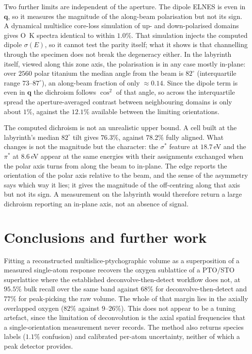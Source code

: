 \documentclass[aps,prb,twocolumn,superscriptaddress,floatfix,nofootinbib]{revtex4-2}
\begin{document}
Two further limits are independent of the aperture. The dipole ELNES is even in $\mathbf{q}$, so it measures the magnitude of the along-beam polarisation but not its sign. A dynamical multislice core-loss simulation of up- and down-polarised domains gives O~K spectra identical to within $1.0\%$. That simulation injects the computed dipole $\sigma(E)$, so it cannot test the parity itself; what it shows is that channelling through the specimen does not break the degeneracy either. In the labyrinth itself, viewed along this zone axis, the polarisation is in any case mostly in-plane: over $2560$ polar titanium the median angle from the beam is $82^\circ$ (interquartile range $73$--$87^\circ$), an along-beam fraction of only $\approx0.14$. Since the dipole term is even in $\mathbf{q}$ the dichroism follows $\cos^2$ of that angle, so across the interquartile spread the aperture-averaged contrast between neighbouring domains is only about $1\%$, against the $12.1\%$ available between the limiting orientations.

The computed dichroism is not an unrealistic upper bound. A cell built at the labyrinth's median $82^\circ$ tilt gives $76.3\%$, against $78.2\%$ fully aligned. What changes is not the magnitude but the character: the $\sigma^*$ feature at $18.7$\,eV and the $\pi^*$ at $8.6$\,eV appear at the same energies with their assignments exchanged when the polar axis turns from along the beam to in-plane. The edge reports the orientation of the polar axis relative to the beam, and the sense of the asymmetry says which way it lies; it gives the magnitude of the off-centring along that axis but not its sign. A measurement on the labyrinth would therefore return a large dichroism reporting an in-plane axis, not an absence of signal.

\section{Conclusions and further work}

Fitting a reconstructed multislice-ptychographic volume as a superposition of a measured single-atom response recovers the oxygen sublattice of a PTO/STO superlattice where the established deconvolve-then-detect workflow does not, at $95.5\%$ bulk recall over the same band against $68\%$ for deconvolve-then-detect and $77\%$ for peak-picking the raw volume. The whole of that margin lies in the axially overlapped oxygen ($82\%$ against $9$--$26\%$). This does not appear to be a tuning artefact, since the limitation of deconvolution is the axial spatial frequencies that a single-orientation measurement never records. The method also returns species labels ($1.1\%$ confusion) and calibrated per-atom uncertainty, neither of which a peak detector provides.
\end{document}
